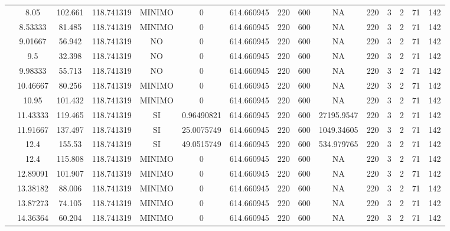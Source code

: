 \begin{table}[H]
{\begin{tabular}{|c|c|c|c|c|c|c|c|c|c|c|c|c|c|c|}
\cline{2-15}    & 8.05 & 102.661 & 118.741319 & MINIMO & 0   & 614.660945 & 220 & 600 & NA  & 220 & 3   & 2   & 71  & 142 \bigstrut\\
\cline{2-15}    & 8.53333 & 81.485 & 118.741319 & MINIMO & 0   & 614.660945 & 220 & 600 & NA  & 220 & 3   & 2   & 71  & 142 \bigstrut\\
\cline{2-15}    & 9.01667 & 56.942 & 118.741319 & NO  & 0   & 614.660945 & 220 & 600 & NA  & 220 & 3   & 2   & 71  & 142 \bigstrut\\
\cline{2-15}    & 9.5 & 32.398 & 118.741319 & NO  & 0   & 614.660945 & 220 & 600 & NA  & 220 & 3   & 2   & 71  & 142 \bigstrut\\
\cline{2-15}    & 9.98333 & 55.713 & 118.741319 & NO  & 0   & 614.660945 & 220 & 600 & NA  & 220 & 3   & 2   & 71  & 142 \bigstrut\\
\cline{2-15}    & 10.46667 & 80.256 & 118.741319 & MINIMO & 0   & 614.660945 & 220 & 600 & NA  & 220 & 3   & 2   & 71  & 142 \bigstrut\\
\cline{2-15}    & 10.95 & 101.432 & 118.741319 & MINIMO & 0   & 614.660945 & 220 & 600 & NA  & 220 & 3   & 2   & 71  & 142 \bigstrut\\
\cline{2-15}    & 11.43333 & 119.465 & 118.741319 & SI  & 0.96490821 & 614.660945 & 220 & 600 & 27195.9547 & 220 & 3   & 2   & 71  & 142 \bigstrut\\
\cline{2-15}    & 11.91667 & 137.497 & 118.741319 & SI  & 25.0075749 & 614.660945 & 220 & 600 & 1049.34605 & 220 & 3   & 2   & 71  & 142 \bigstrut\\
\cline{2-15}    & 12.4 & 155.53 & 118.741319 & SI  & 49.0515749 & 614.660945 & 220 & 600 & 534.979765 & 220 & 3   & 2   & 71  & 142 \bigstrut\\
\cline{2-15}    & 12.4 & 115.808 & 118.741319 & MINIMO & 0   & 614.660945 & 220 & 600 & NA  & 220 & 3   & 2   & 71  & 142 \bigstrut\\
\cline{2-15}    & 12.89091 & 101.907 & 118.741319 & MINIMO & 0   & 614.660945 & 220 & 600 & NA  & 220 & 3   & 2   & 71  & 142 \bigstrut\\
\cline{2-15}    & 13.38182 & 88.006 & 118.741319 & MINIMO & 0   & 614.660945 & 220 & 600 & NA  & 220 & 3   & 2   & 71  & 142 \bigstrut\\
\cline{2-15}    & 13.87273 & 74.105 & 118.741319 & MINIMO & 0   & 614.660945 & 220 & 600 & NA  & 220 & 3   & 2   & 71  & 142 \bigstrut\\
\cline{2-15}    & 14.36364 & 60.204 & 118.741319 & MINIMO & 0   & 614.660945 & 220 & 600 & NA  & 220 & 3   & 2   & 71  & 142 \bigstrut\\

\end{tabular}}
\end{table}
